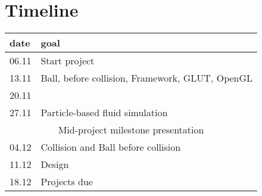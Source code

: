 \chapter*{Timeline}
\begin{center}
	\begin{tabular}{ll}
		\toprule
		date& goal\\
		\midrule
		06.11&Start project\\
		13.11&Ball, before collision, Framework, GLUT, OpenGL\\
		20.11&\\
		27.11&Particle-based fluid simulation\\
		\midrule
		\multicolumn{2}{c}{Mid-project milestone presentation}\\
		\midrule
		04.12&Collision and Ball before collision \\
		11.12&Design\\
		18.12&Projects due\\
		\bottomrule
	\end{tabular}
\end{center}
